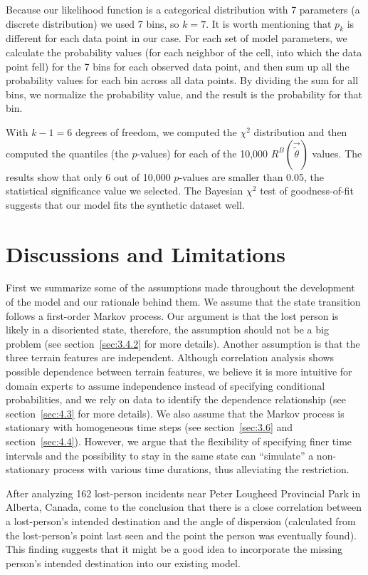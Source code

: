 Because our likelihood function is a categorical distribution with 7 parameters (a discrete distribution) we used 7 bins, so $k=7$. It is worth mentioning that $p_k$ is different for each data point in our case. For each set of model parameters, we calculate the probability values (for each neighbor of the cell, into which the data point fell) for the 7 bins for each observed data point, and then sum up all the probability values for each bin across all data points. By dividing the sum for all bins, we normalize the probability value, and the result is the probability for that bin.

With $k-1=6$ degrees of freedom, we computed the $\chi^2$ distribution and then computed the quantiles (the $p$-values) for each of the 10,000 $R^B(\vec{\tilde{\theta}})$ values. The results show that only 6 out of 10,000 $p$-values are smaller than 0.05, the statistical significance value we selected. The Bayesian $\chi^2$ test of goodness-of-fit suggests that our model fits the synthetic dataset well.

\section{Discussions and Limitations}
\label{sec:5}

First we summarize some of the assumptions made throughout the development of the model and our rationale behind them. We assume that the state transition follows a first-order Markov process. Our argument is that the lost person is likely in a disoriented state, therefore, the assumption should not be a big problem (see section~\ref{sec:3.4.2} for more details). Another assumption is that the three terrain features are independent. Although correlation analysis shows possible dependence between terrain features, we believe it is more intuitive for domain experts to assume independence instead of specifying conditional probabilities, and we rely on data to identify the dependence relationship (see section~\ref{sec:4.3} for more details). We also assume that the Markov process is stationary with homogeneous time steps (see section~\ref{sec:3.6} and section~\ref{sec:4.4}). However, we argue that the flexibility of specifying finer time intervals and the possibility to stay in the same state can ``simulate'' a non-stationary process with various time durations, thus alleviating the restriction.

After analyzing 162 lost-person incidents near Peter Lougheed Provincial Park in Alberta, Canada, \cite{Heth1998Characteristics} come to the conclusion that there is a close correlation between a lost-person's intended destination and the angle of dispersion (calculated from the lost-person's point last seen and the point the person was eventually found). This finding suggests that it might be a good idea to incorporate the missing person's intended destination into our existing model.

